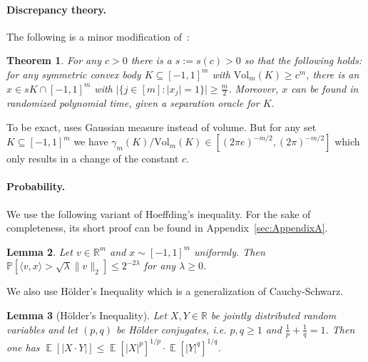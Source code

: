 \documentclass[12pt,english]{article}
\theoremstyle{theorem}
\newtheorem{theorem}{Theorem}
\newtheorem{lemma}[theorem]{Lemma}
\theoremstyle{remark}
\providecommand{\setR}{\mathbb{R}}
\newcommand{\E}{\mathop{\mathbb{E}}}
\newcommand{\Vol}{\mathrm{Vol}}
\begin{document}
\paragraph{Discrepancy theory.}
The following is a minor modification of~\cite[Theorem 9]{ReisRothvossRSA23}:
\begin{theorem} \label{thm:FractionalColoring}
  For any $c > 0$ there is a $s := s(c) > 0$ so that the following holds:
  for any symmetric convex body $K \subseteq [-1,1]^m$ with $\Vol_m(K) \geq c^m$, there is an $x \in sK \cap [-1,1]^m$ with $|\{ j \in [m] : |x_j| = 1\}| \geq \frac{m}{2}$. Moreover, $x$ can be found in randomized polynomial time, given a separation oracle for $K$.
\end{theorem}
To be exact, \cite[Theorem 9]{ReisRothvossRSA23} uses Gaussian measure instead of volume.
But for any set $K \subseteq [-1,1]^m$ we have $\gamma_m(K)/\Vol_m(K) \in [(2\pi e)^{-m/2}, (2\pi)^{-m/2}]$ which only results in a change of the constant $c$.

\paragraph{Probability.}
We use the following variant of Hoeffding's inequality.
For the sake of completeness, its short proof can be found in Appendix~\ref{sec:AppendixA}.
\begin{lemma} \label{lem:cubeconc}
Let $v \in \setR^m$ and $x \sim [-1,1]^m$ uniformly. Then $\mathbb{P}[\langle v, x \rangle > \sqrt{\lambda} \|v\|_2] \le 2^{-2\lambda}$ for any $\lambda \ge 0$.
\end{lemma}
We also use H\"older's Inequality which is a generalization of Cauchy-Schwarz.
\begin{lemma}[H\"older's Inequality] \label{lem:Hoelder}
 Let $X,Y \in \setR$ be jointly distributed random variables and let $(p,q)$ be  H\"older conjugates, i.e. $p,q \geq 1$ and $\frac{1}{p} + \frac{1}{q} = 1$. Then one has $\E[|X \cdot Y|] \leq \E[|X|^p]^{1/p} \cdot \E[|Y|^q]^{1/q}$.
 \end{lemma}
  
\end{document}
